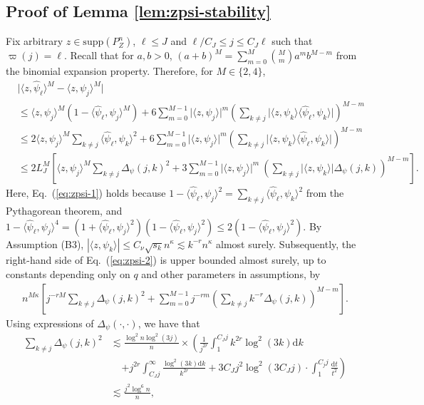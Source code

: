 \documentclass[11pt,a4paper]{article}
\renewcommand{\hat}{\widehat}
\theoremstyle{definition}
\theoremstyle{plain}
\theoremstyle{remark}
\newcommand{\supp}{\mathrm{supp}}
\newcommand{\ud}{\mathrm d}
\begin{document}
\subsection{Proof of Lemma \ref{lem:zpsi-stability}}
Fix arbitrary $z\in\supp(P_Z^n)$, $\ell\leq J$ and $\ell/C_J\leq j\leq C_J\ell$ such that $\varpi(j)=\ell$. 
Recall that for $a,b>0$, $(a+b)^M = \sum_{m=0}^M \binom{M}{m}a^mb^{M-m}$ from the binomial expansion property.
Therefore, for $M\in\{2,4\}$, 
\begin{align}
&\big|\langle z,\hat\psi_\ell\rangle^M-\langle z,\psi_j\rangle^M\big|\nonumber\\
& \leq \langle z,\psi_j\rangle^M(1-\langle\hat\psi_\ell,\psi_j\rangle^M) + 6\sum_{m=0}^{M-1}\big|\langle z,\psi_j\rangle\big|^m\left(\sum_{k\neq j}\big|\langle z,\psi_k\rangle\langle\hat\psi_\ell,\psi_k\rangle\big|\right)^{M-m}\nonumber\\
&\leq 2\langle z,\psi_j\rangle^M\sum_{k\neq j}\langle\hat\psi_\ell,\psi_k\rangle^2 +  6\sum_{m=0}^{M-1}\big|\langle z,\psi_j\rangle\big|^m\left(\sum_{k\neq j}\big|\langle z,\psi_k\rangle\langle\hat\psi_\ell,\psi_k\rangle\big|\right)^{M-m}\label{eq:zpsi-1}\\
&\leq 2L_J^M\left[\langle z,\psi_j\rangle^M\sum_{k\neq j}\Delta_\psi(j,k)^2 +3\sum_{m=0}^{M-1}\big|\langle z,\psi_j\rangle\big|^m\ \left(\sum_{k\neq j}\big|\langle z,\psi_k\rangle\big|\Delta_\psi(j,k)\right)^{M-m} \right].\label{eq:zpsi-2}
\end{align}
Here, Eq.~(\ref{eq:zpsi-1}) holds because $1-\langle\hat\psi_\ell,\psi_j\rangle^2=\sum_{k\neq j}\langle\hat\psi_\ell,\psi_k\rangle^2$ from the Pythagorean theorem,
and $1-\langle\hat\psi_\ell,\psi_j\rangle^4 = (1+\langle\hat\psi_\ell,\psi_j\rangle^2)(1-\langle\hat\psi_\ell,\psi_j\rangle^2) \leq 2(1-\langle\hat\psi_\ell,\psi_j\rangle^2)$.
By Assumption (B3), $|\langle z,\psi_k\rangle|\leq C_\nu\sqrt{s_k}n^{\kappa} \lesssim k^{-r}n^{\kappa}$ almost surely.
Subsequently, the right-hand side of Eq.~(\ref{eq:zpsi-2}) is upper bounded almost surely, up to constants depending only on $q$ and other parameters in assumptions, by
\begin{align}
 n^{M\kappa}\left[j^{-rM}\sum_{k\neq j}\Delta_\psi(j,k)^2 + \sum_{m=0}^{M-1} j^{-rm}\left(\sum_{k\neq j}k^{-r}\Delta_\psi(j,k)\right)^{M-m} \right].
 \label{eq:zpsi-3}
\end{align}
Using expressions of $\Delta_\psi(\cdot,\cdot)$, we have that
\begin{align}
\sum_{k\neq j}\Delta_\psi(j,k)^2 &\lesssim \frac{\log^2 n\log^2(3j)}{n}\times \left( \frac{1}{j^{2r}}\int_1^{C_J j} k^{2r}\log^2(3k)\ud k \right.\nonumber\\
&\;\;\;\;\left.+ j^{2r}\int_{C_J j}^{\infty}\frac{\log^2(3k)\ud k}{k^{2r}} + 3C_J j^2\log^2(3C_Jj)\cdot \int_1^{C_j j}\frac{\ud t}{t^2}\right)\nonumber\\
&\lesssim \frac{j^2\log^6 n}{n},\label{eq:zpsi-4}
\end{align}
\end{document}
